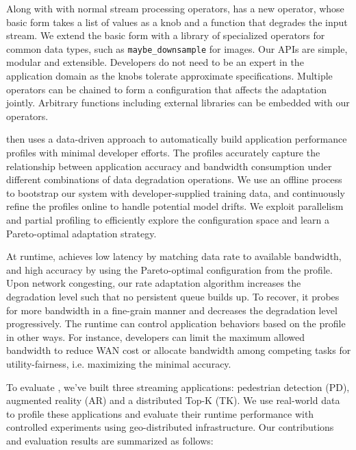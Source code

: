 Along with with normal stream processing operators, \sysname{} has a new
\maybe{} operator, whose basic form takes a list of values as a knob and a
function that degrades the input stream. We extend the basic form with a library
of specialized operators for common data types, such as
\texttt{maybe\_downsample} for images.  Our APIs are simple, modular and
extensible. Developers do not need to be an expert in the application domain as
the knobs tolerate approximate specifications. Multiple operators can be chained
to form a configuration that affects the adaptation jointly. Arbitrary functions
including external libraries can be embedded with our operators.

\sysname{} then uses a data-driven approach to automatically build application
performance profiles with minimal developer efforts. The profiles accurately
capture the relationship between application accuracy and bandwidth consumption
under different combinations of data degradation operations. We use an offline
process to bootstrap our system with developer-supplied training data, and
continuously refine the profiles online to handle potential model drifts. We
exploit parallelism and partial profiling to efficiently explore the
configuration space and learn a Pareto-optimal adaptation strategy.

At runtime, \sysname{} achieves low latency by matching data rate to available
bandwidth, and high accuracy by using the Pareto-optimal configuration from the
profile. Upon network congesting, our rate adaptation algorithm increases the
degradation level such that no persistent queue builds up. To recover, it probes
for more bandwidth in a fine-grain manner and decreases the degradation level
progressively. The runtime can control application behaviors based on the
profile in other ways. For instance, developers can limit the maximum allowed
bandwidth to reduce WAN cost or allocate bandwidth among competing tasks for
utility-fairness, i.e. maximizing the minimal accuracy.

To evaluate \sysname{}, we've built three streaming applications: pedestrian
detection (PD), augmented reality (AR) and a distributed Top-K (TK). We use
real-world data to profile these applications and evaluate their runtime
performance with controlled experiments using geo-distributed
infrastructure. Our contributions and evaluation results are summarized as
follows:

